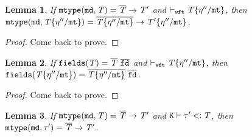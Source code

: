 \documentclass[onecolumn,nocopyrightspace]{sigplanconf}
\newtheorem{lemma}{Lemma}
\theoremstyle{lessintrusive}
\theoremstyle{plain}
\theoremstyle{custom}
\theoremstyle{subcase-custom}
\begin{document}
\begin{lemma}
\label{pf:fmtype-substitutes}
If $\mathtt{mtype}(\mathtt{md},\mathit{T}) = \overline{\mathit{T}}\rightarrow\mathit{T}'$ and $\vdash_{\tt wft}\mathit{T}\{\eta''/\mathtt{mt}\}$, then $\mathtt{mtype}(\mathtt{md},\mathit{T}\{\eta''/\mathtt{mt}\}) = \overline{\mathit{T}\{\eta''/\mathtt{mt}\}}\rightarrow\mathit{T}'\{\eta''/\mathtt{mt}\}$. 
\end{lemma} 

\begin{proof}
Come back to prove.
\end{proof}

\begin{lemma}
\label{pf:ffields-substitutes}
If $\Ffields(\bt) = \overline{\bt}\ \overline{\Fname}$ and $\vdash_{\tt wft}\mathit{T}\{\eta''/\mathtt{mt}\}$, then $\Ffields(\bt\subst{\mtvar}{\basemode''}) = \overline{\bt\subst{\mtvar}{\basemode''}}\ \overline{\Fname}$.
\end{lemma} 

\begin{proof}
Come back to prove.
\end{proof}


\begin{lemma}
\label{pf:fmtype-subtypes}
If $\mathtt{mtype}(\mathtt{md},\mathit{T}) = \overline{\mathit{T}}\rightarrow\mathit{T}'$ and $\mathtt{K}\vdash\tau'\mathbin{<\vcentcolon}\mathit{T}$, then $\mathtt{mtype}(\mathtt{md},\tau') = \overline{\mathit{T}}\rightarrow\mathit{T}'$. 
\end{lemma}
\end{document}

